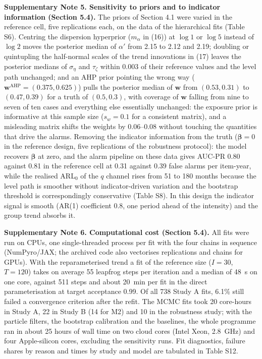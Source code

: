 \textbf{Supplementary Note 5. Sensitivity to priors and to indicator information (Section 5.4).}
The priors of Section 4.1 were varied in the reference cell, five replications each, on the data of the hierarchical fits (Table S6). Centring the dispersion hyperprior ($m_\alpha$ in (16)) at $\log 1$ or $\log 5$ instead of $\log 2$ moves the posterior median of $\alpha'$ from 2.15 to 2.12 and 2.19; doubling or quintupling the half-normal scales of the trend innovations in (17) leaves the posterior medians of $\sigma_\eta$ and $\tau_\zeta$ within 0.003 of their reference values and the level path unchanged; and an AHP prior pointing the wrong way ($\mathbf{w}^{\mathrm{AHP}} = (0.375, 0.625)$) pulls the posterior median of $\mathbf{w}$ from $(0.53, 0.31)$ to $(0.47, 0.39)$ for a truth of $(0.5, 0.3)$, with coverage of $\mathbf{w}$ falling from nine to seven of ten cases and everything else essentially unchanged: the exposure prior is informative at this sample size ($s_w = 0.1$ for a consistent matrix), and a misleading matrix shifts the weights by 0.06--0.08 without touching the quantities that drive the alarms. Removing the indicator information from the truth ($\boldsymbol{\beta} = 0$ in the reference design, five replications of the robustness protocol): the model recovers $\boldsymbol{\beta}$ at zero, and the alarm pipeline on these data gives AUC-PR 0.80 against 0.81 in the reference cell at 0.31 against 0.39 false alarms per item-year, while the realised ARL$_0$ of the $q$ channel rises from 51 to 180 months because the level path is smoother without indicator-driven variation and the bootstrap threshold is correspondingly conservative (Table S8). In this design the indicator signal is smooth (AR(1) coefficient 0.8, one period ahead of the intensity) and the group trend absorbs it.

\textbf{Supplementary Note 6. Computational cost (Section 5.4).}
All fits were run on CPUs, one single-threaded process per fit with the four chains in sequence (NumPyro/JAX; the archived code also vectorises replications and chains for GPUs). With the reparameterised trend a fit of the reference size ($I = 30$, $T = 120$) takes on average 55 leapfrog steps per iteration and a median of 48~s on one core, against 511 steps and about 20~min per fit in the direct parameterisation at target acceptance 0.99. Of all 738 Study A fits, 6.1\% still failed a convergence criterion after the refit. The MCMC fits took 20 core-hours in Study A, 22 in Study B (14 for M2) and 10 in the robustness study; with the particle filters, the bootstrap calibration and the baselines, the whole programme ran in about 25 hours of wall time on two cloud cores (Intel Xeon, 2.8~GHz) and four Apple-silicon cores, excluding the sensitivity runs. Fit diagnostics, failure shares by reason and times by study and model are tabulated in Table S12.
